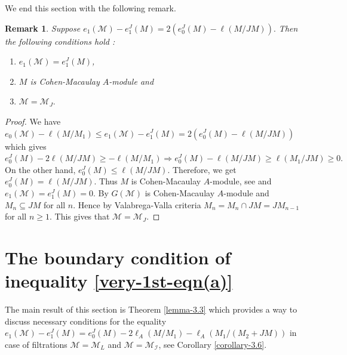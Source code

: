 \documentclass[11pt,reqno]{amsart}
\newtheorem{remark}[theorem]{Remark}
\theoremstyle{definition}
\def\M{{\mathcal M}}
\def\I{{\mathcal I}}
\numberwithin{equation}{section}
\begin{document}
We end this section with the following remark. 
\begin{remark}\label{remark-I1=Q-case}
	Suppose $e_1(\M)-e_1^J(M)=2(e_0^J(M)-\ell(M/JM)).$ Then the following conditions hold
    :
	\begin{enumerate}[label=(\roman*)]
		\item  $e_1(\M)=e_1^J(M)$,
		\item $M$ is Cohen-Macaulay $A$-module and 
		\item $\M=\M_J.$
	\end{enumerate}
\end{remark}
\begin{proof}
	We have $e_0(\M)-\ell(M/M_1)\leq e_1(\M)-e_1^J(M)=2(e_0^J(M)-\ell(M/JM))$ which gives 
	$e_0^J(M)-2\ell(M/JM)\geq -\ell(M/M_1)\Rightarrow e_0^J(M)-\ell(M/JM)\geq \ell(M_1/JM)\geq 0.$ On the other hand, $e_0^J(M)\leq \ell(M/JM)$. Therefore, we get $e_0^J(M)=\ell(M/JM)$. 
	Thus $M$ is Cohen-Macaulay $A$-module, see \cite[Corollary 4.7.11]{bruns-herzog} and $e_1(\M)=e_1^J(M)=0.$ By \cite[Theorem 2.7]{rossi-valla} $G(\M)$ is Cohen-Macaulay $A$-module and $M_n\subseteq JM$ for all $n.$ Hence by Valabrega-Valla criteria $M_n=M_n\cap JM= JM_{n-1}$ for all $n\geq 1.$ This gives that $\M=\M_J.$
\end{proof}
\section{\texorpdfstring
{The boundary condition of inequality \eqref{very-1st-eqn(a)}}
{The boundary condition of inequality (1)}
}\label{Section-inequality}
The main result of this section is Theorem \ref{lemma-3.3} which provides a way to discuss necessary conditions for the equality 
 $ e_1(\M)-e_1^J(M)= e_0^J(M)-  2\ell_A(M/M_1)-\ell_A(M_1/(M_2+JM))$
in case of filtrations $\M=\M_L$ and $\M=\M_\I$, see Corollary \ref{corollary-3.6}. 
\end{document}
